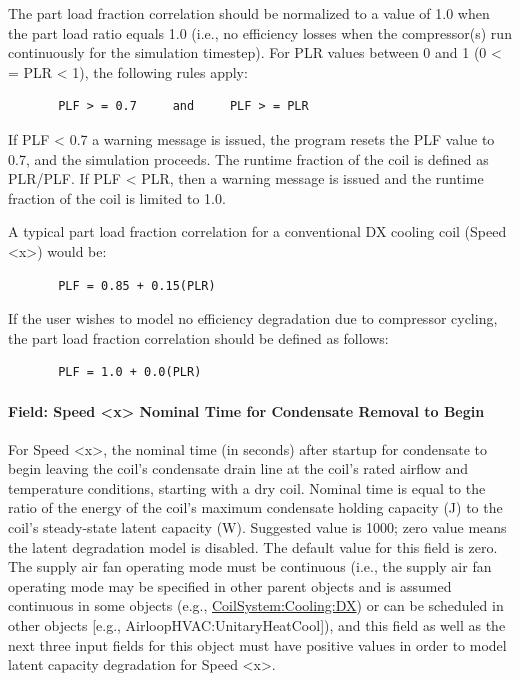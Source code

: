 The part load fraction correlation should be normalized to a value of 1.0 when the part load ratio equals 1.0 (i.e., no efficiency losses when the compressor(s) run continuously for the simulation timestep). For PLR values between 0 and 1 (0 \textless{} = PLR \textless{} 1), the following rules apply:

\begin{lstlisting}
       PLF > = 0.7     and     PLF > = PLR
\end{lstlisting}

If PLF \textless{} 0.7 a warning message is issued, the program resets the PLF value to 0.7, and the simulation proceeds. The runtime fraction of the coil is defined as PLR/PLF. If PLF \textless{} PLR, then a warning message is issued and the runtime fraction of the coil is limited to 1.0.

A typical part load fraction correlation for a conventional DX cooling coil (Speed \textless{}x\textgreater{}) would be:

\begin{lstlisting}
       PLF = 0.85 + 0.15(PLR)
\end{lstlisting}

If the user wishes to model no efficiency degradation due to compressor cycling, the part load fraction correlation should be defined as follows:

\begin{lstlisting}
       PLF = 1.0 + 0.0(PLR)
\end{lstlisting}

\paragraph{Field: Speed \textless{}x\textgreater{} Nominal Time for Condensate Removal to Begin}\label{field-speed-x-nominal-time-for-condensate-removal-to-begin}

For Speed \textless{}x\textgreater{}, the nominal time (in seconds) after startup for condensate to begin leaving the coil's condensate drain line at the coil's rated airflow and temperature conditions, starting with a dry coil. Nominal time is equal to the ratio of the energy of the coil's maximum condensate holding capacity (J) to the coil's steady-state latent capacity (W). Suggested value is 1000; zero value means the latent degradation model is disabled. The default value for this field is zero. The supply air fan operating mode must be continuous (i.e., the supply air fan operating mode may be specified in other parent objects and is assumed continuous in some objects (e.g., \hyperref[coilsystemcoolingdx]{CoilSystem:Cooling:DX}) or can be scheduled in other objects {[}e.g., AirloopHVAC:UnitaryHeatCool{]}), and this field as well as the next three input fields for this object must have positive values in order to model latent capacity degradation for Speed \textless{}x\textgreater{}.

